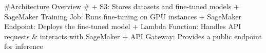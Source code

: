 #Architecture Overview #
+ S3: Stores datasets and fine-tuned models
+ SageMaker Training Job: Runs fine-tuning on GPU instances
+ SageMaker Endpoint: Deploys the fine-tuned model
+ Lambda Function: Handles API requests & interacts with SageMaker
+ API Gateway: Provides a public endpoint for inference
